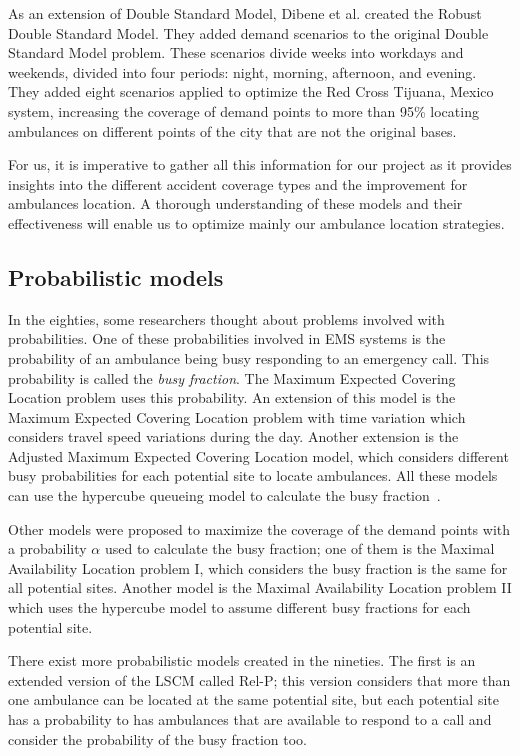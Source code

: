 As an extension of Double Standard Model, Dibene et al. \cite{dibene2017optimizing} created the Robust Double Standard Model. They added demand scenarios to the original Double Standard Model problem. These scenarios divide weeks into workdays and weekends, divided into four periods: night, morning, afternoon, and evening. They added eight scenarios applied to optimize the Red Cross Tijuana, Mexico system, increasing the coverage of demand points to more than 95\% locating ambulances on different points of the city that are not the original bases.  

For us, it is imperative to gather all this information for our project as it provides insights into the different accident coverage types and the improvement for ambulances location. A thorough understanding of these models and their effectiveness will enable us to optimize mainly our ambulance location strategies.

\subsection{Probabilistic models}

In the eighties, some researchers thought about problems involved with probabilities. One of these probabilities involved in EMS systems is the probability of an ambulance being busy responding to an emergency call. This probability is called the \textit{busy fraction}. The Maximum Expected Covering Location problem uses this probability. An extension of this model is the Maximum Expected Covering Location problem with time variation which considers travel speed variations during the day. Another extension is the Adjusted Maximum Expected Covering Location model, which considers different busy probabilities for each potential site to locate ambulances. All these models can use the hypercube queueing model to calculate the busy fraction~\cite{galvao2008emergency}.

Other models were proposed to maximize the coverage of the demand points with a probability $\alpha$ used to calculate the busy fraction; one of them is the Maximal Availability Location problem I, which considers the busy fraction is the same for all potential sites. Another model is the Maximal Availability Location problem II which uses the hypercube model to assume different busy fractions for each potential site.

There exist more probabilistic models created in the nineties. The first is an extended version of the LSCM called Rel-P; this version considers that more than one ambulance can be located at the same potential site, but each potential site has a probability to has ambulances that are available to respond to a call and consider the probability of the busy fraction too. 


